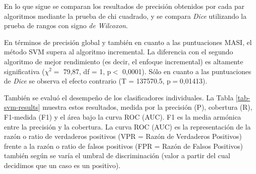

En lo que sigue se comparan los resultados de precisi\'on obtenidos por cada par algoritmos mediante la prueba de chi cuadrado, y se compara {\em Dice} utilizando la prueba de rangos con signo {\em de Wilcoxon}.

En t\'erminos de precisi\'on global y tambi\'en en cuanto a las puntuaciones MASI, el m\'etodo SVM supera al algoritmo incremental. La diferencia con el segundo algoritmo de mejor rendimiento (es decir, el enfoque incremental) es altamente significativa ($\chi^{2}=$ 79,87, df = 1, p$<$ 0,0001). S\'olo en cuanto a las puntuaciones de {\it Dice} se observa el efecto contrario (T = 137570.5, p$=$0,01413).

Tambi\'en se evalu\'o el desempe\~no de los clasificadores individuales. La Tabla \ref{tab-svm-results} muestra estos resultados, medida por la precisi\'on (P), cobertura (R), F1-medida (F1) y el \'area bajo la curva ROC (AUC). F1 es la media arm\'onica entre la precisi\'on y la cobertura. La curva ROC (AUC) es la representaci\'on de la raz\'on o ratio de verdaderos positivos (VPR = Raz\'on de Verdaderos Positivos) frente a la raz\'on o ratio de falsos positivos (FPR = Raz\'on de Falsos Positivos) tambi\'en seg\'un se varía el umbral de discriminaci\'on (valor a partir del cual decidimos que un caso es un positivo).


